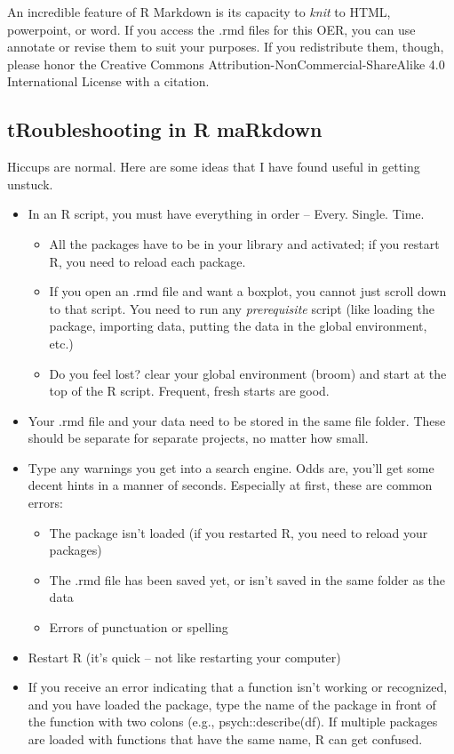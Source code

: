 \documentclass[
  english,
]{book}
\providecommand{\tightlist}{%
  \setlength{\itemsep}{0pt}\setlength{\parskip}{0pt}}
\begin{document}
An incredible feature of R Markdown is its capacity to \emph{knit} to HTML, powerpoint, or word. If you access the .rmd files for this OER, you can use annotate or revise them to suit your purposes. If you redistribute them, though, please honor the Creative Commons Attribution-NonCommercial-ShareAlike 4.0 International License with a citation.

\hypertarget{troubleshooting-in-r-markdown}{%
\subsection{tRoubleshooting in R maRkdown}\label{troubleshooting-in-r-markdown}}

Hiccups are normal. Here are some ideas that I have found useful in getting unstuck.

\begin{itemize}
\tightlist
\item
  In an R script, you must have everything in order -- Every. Single. Time.

  \begin{itemize}
  \tightlist
  \item
    All the packages have to be in your library and activated; if you restart R, you need to reload each package.
  \item
    If you open an .rmd file and want a boxplot, you cannot just scroll down to that script. You need to run any \emph{prerequisite} script (like loading the package, importing data, putting the data in the global environment, etc.)
  \item
    Do you feel lost? clear your global environment (broom) and start at the top of the R script. Frequent, fresh starts are good.
  \end{itemize}
\item
  Your .rmd file and your data need to be stored in the same file folder. These should be separate for separate projects, no matter how small.
\item
  Type any warnings you get into a search engine. Odds are, you'll get some decent hints in a manner of seconds. Especially at first, these are common errors:

  \begin{itemize}
  \tightlist
  \item
    The package isn't loaded (if you restarted R, you need to reload your packages)
  \item
    The .rmd file has been saved yet, or isn't saved in the same folder as the data
  \item
    Errors of punctuation or spelling
  \end{itemize}
\item
  Restart R (it's quick -- not like restarting your computer)
\item
  If you receive an error indicating that a function isn't working or recognized, and you have loaded the package, type the name of the package in front of the function with two colons (e.g., psych::describe(df). If multiple packages are loaded with functions that have the same name, R can get confused.
\end{itemize}
\end{document}

